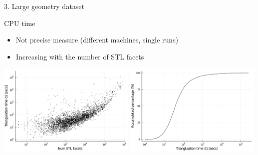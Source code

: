 \documentclass{beamer}
\begin{document}
\begin{frame}{3. Large geometry dataset}

  \begin{block}{CPU time}
  \begin{itemize}
    \item
      Not precise measure (different machines, single runs)
    \item
      Increasing with the number of STL facets
  \end{itemize}
  \end{block}

  \includegraphics[width=0.49\textwidth]{../analysis/plots/num_stl_facets_time}
  \includegraphics[width=0.49\textwidth]{../analysis/plots/histogram_time}
\end{frame}


%
%
%
%
%
% 
%
%
\end{document}
